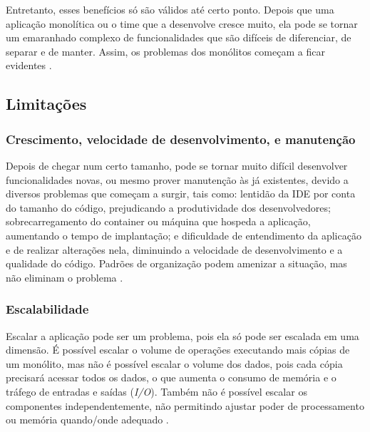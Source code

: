 Entretanto, esses benefícios só são válidos até certo ponto. Depois que uma aplicação monolítica ou o time que a desenvolve cresce muito, ela pode se tornar um emaranhado complexo de funcionalidades que são difíceis de diferenciar, de separar e de manter. Assim, os problemas dos monólitos começam a ficar evidentes \cite{microservicesIO_monolithic_architecture}.

\subsection{Limitações}\label{subsection-monolitos-limitacoes}

\subsubsection{Crescimento, velocidade de desenvolvimento, e manutenção}
Depois de chegar num certo tamanho, pode se tornar muito difícil desenvolver funcionalidades novas, ou mesmo prover manutenção às já existentes, devido a diversos problemas que começam a surgir, tais como: lentidão da IDE por conta do tamanho do código, prejudicando a produtividade dos desenvolvedores; sobrecarregamento do container ou máquina que hospeda a aplicação, aumentando o tempo de implantação; e dificuldade de entendimento da aplicação e de realizar alterações nela, diminuindo a velocidade de desenvolvimento e a qualidade do código. Padrões de organização podem amenizar a situação, mas não eliminam o problema \cite{microservicesIO_monolithic_architecture}.

\subsubsection{Escalabilidade}
Escalar a aplicação pode ser um problema, pois ela só pode ser escalada em uma dimensão. É possível escalar o volume de operações executando mais cópias de um monólito, mas não é possível escalar o volume dos dados, pois cada cópia precisará acessar todos os dados, o que aumenta o consumo de memória e o tráfego de entradas e saídas (\emph{I/O}). Também não é possível escalar os componentes independentemente, não permitindo ajustar poder de processamento ou memória quando/onde adequado \cite{microservicesIO_monolithic_architecture}.


